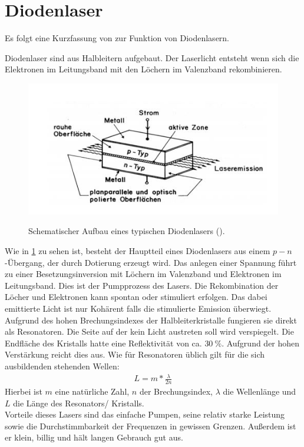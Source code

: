 \documentclass[../bericht.tex]{subfiles}
\begin{document}
    \section{Diodenlaser}

      Es folgt eine Kurzfassung von \cite{quant} zur Funktion von Diodenlasern.

      Diodenlaser sind aus Halbleitern aufgebaut. Der Laserlicht entsteht wenn sich die Elektronen im Leitungsband mit den Löchern im Valenzband rekombinieren.
      \begin{figure}[tb]
        \begin{center}
          \fbox
          {
          \includegraphics[angle=0, height=6 cm]{figures/diodenlaser.JPG}
          }
          \caption{Schematischer Aufbau eines typischen Diodenlasers (\cite{quant}). }
          \label{fig:diodenlaser}
        \end{center}
      \end{figure}

      Wie in \cref{fig:diodenlaser} zu sehen ist, besteht der Hauptteil eines Diodenlasers aus einem $p-n$-Übergang, der durch Dotierung erzeugt wird. Das anlegen einer Spannung führt zu einer Besetzungsinversion mit Löchern im Valenzband und Elektronen im Leitungsband. Dies ist der Pumpprozess des Lasers. Die Rekombination der Löcher und Elektronen kann spontan oder stimuliert erfolgen. Das dabei emittierte Licht ist nur Kohärent falls die stimulierte Emission überwiegt.
      Aufgrund des hohen Brechungsindexes der Halbleiterkristalle fungieren sie direkt als Resonatoren. Die Seite auf der kein Licht austreten soll wird verspiegelt. Die Endfläche des Kristalls hatte eine Reflektivität von ca. $\SI{30}{\percent}$. Aufgrund der hohen Verstärkung reicht dies aus. Wie für Resonatoren üblich gilt für die sich ausbildenden stehenden Wellen:
      \begin{align*}
        L=m*\frac{\lambda}{2n}
      \end{align*}
      Hierbei ist $m$ eine natürliche Zahl, $n$ der Brechungsindex, $\lambda$ die Wellenlänge und $L$ die Länge des Resonators/ Kristalls.\\
      Vorteile dieses Lasers sind das einfache Pumpen, seine relativ starke Leistung sowie die Durchstimmbarkeit der Frequenzen in gewissen Grenzen. Außerdem ist er klein, billig und hält langen Gebrauch gut aus.
\end{document}
